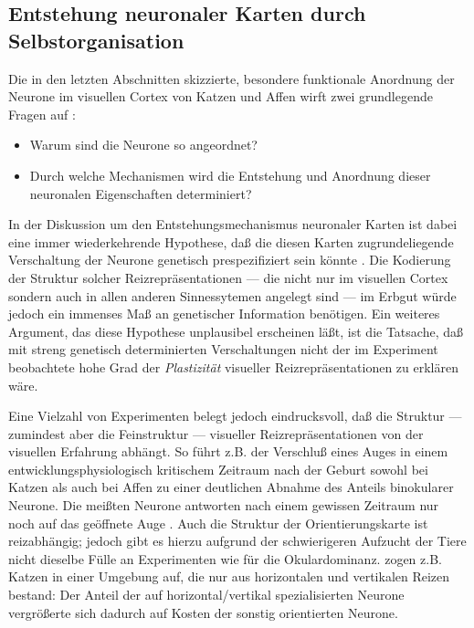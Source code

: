 \subsection{Entstehung neuronaler Karten durch Selbstorganisation}
\label{plastizitaet}

Die in den letzten Abschnitten skizzierte, besondere funktionale Anordnung
der Neurone im visuellen Cortex von Katzen und Affen wirft zwei
grundlegende Fragen auf \cite{marlsburg:1973}:

\begin{itemize}
\item Warum sind die Neurone so angeordnet?
\item Durch welche Mechanismen wird die Entstehung und Anordnung dieser
neuronalen Eigenschaften determiniert?
\end{itemize}

In der Diskussion um den Entstehungsmechanismus neuronaler Karten ist dabei
eine immer wiederkehrende Hypothese, daß die diesen Karten
zugrundeliegende Verschaltung der Neurone genetisch prespezifiziert sein
könnte \parencite[vgl.][]{wiesel:1974,goedecke:1996}. Die Kodierung der
Struktur solcher Reizrepräsentationen --- die nicht nur im visuellen
Cortex sondern auch in allen anderen Sinnessytemen angelegt sind --- im
Erbgut würde jedoch ein immenses Maß an genetischer Information
benötigen.  Ein weiteres Argument, das diese Hypothese unplausibel
erscheinen läßt, ist die Tatsache, daß mit streng genetisch
determinierten Verschaltungen nicht der im Experiment beobachtete hohe Grad
der \emph{Plastizität} visueller Reizrepräsentationen zu erklären wäre.

Eine Vielzahl von Experimenten belegt jedoch eindrucksvoll, daß die
Struktur --- zumindest aber die Feinstruktur --- visueller
Reizrepräsentationen von der visuellen Erfahrung abhängt. So führt
z.B. der Verschluß eines Auges in einem entwicklungsphysiologisch
kritischem Zeitraum nach der Geburt sowohl bei Katzen als auch bei Affen zu
einer deutlichen Abnahme des Anteils binokularer Neurone. Die meißten
Neurone antworten nach einem gewissen Zeitraum nur noch auf das geöffnete
Auge \parencite[siehe z.B.][]{shatz:1978,levay:1980}. Auch die Struktur der
Orientierungskarte ist reizabhängig; jedoch gibt es hierzu aufgrund der
schwierigeren Aufzucht der Tiere nicht dieselbe Fülle an Experimenten wie
für die Okulardominanz. \textcite{blakemore:1970} zogen z.B. Katzen in
einer Umgebung auf, die nur aus horizontalen und vertikalen Reizen bestand:
Der Anteil der auf horizontal/vertikal spezialisierten Neurone
vergrößerte sich dadurch auf Kosten der sonstig orientierten Neurone.

